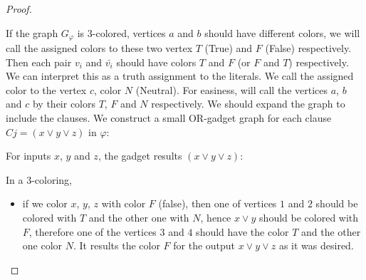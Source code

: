 \documentclass{beamer}
\begin{document}
{\begin{defi}
\begin{proof}
\begin{center}
\end{center}
\vspace{1cm}

If the graph $G_\varphi$ is $3$-colored, vertices $a$ and $b$ should have different colors, we will call the assigned colors to these two vertex $T$ (True) and $F$ (False) respectively. Then each pair $v_i$ and $\bar{v_i}$ should have colors $T$ and $F$ (or $F$ and $T$) respectively. We can interpret this as a truth assignment to the literals. We call the assigned color to the vertex $c$, color $N$ (Neutral). For easiness, will call the vertices $a$, $b$ and $c$ by their colors $T$, $F$ and $N$ respectively. We should expand the graph to include the clauses. We construct a small OR-gadget graph for each clause $Cj = (x \lor y\lor z)$ in $\varphi$:

\begin{center}
\end{center}
\vspace{1cm}


For inputs $x$, $y$ and $z$, the gadget results $(x \lor y\lor z)$:

In a $3$-coloring, 

\begin{itemize}

\item if we color $x$, $y$, $z$ with color $F$ (false), then one of vertices $1$ and $2$ should be colored with $T$ and the other one with $N$, hence $x\lor y$ should be colored with $F$, therefore one of the vertices $3$ and $4$ should have the color $T$ and the other one color $N$. It results the color $F$ for the output $x\lor y\lor z$ as it was desired.



\end{itemize}
\end{proof}
\end{defi}}
\end{document}
